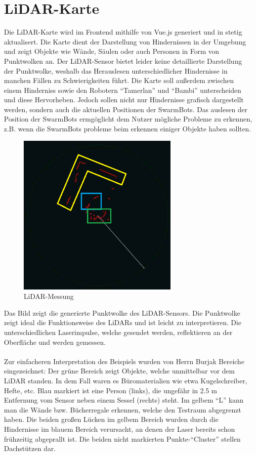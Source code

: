 \section{LiDAR-Karte}
\label{subsec:frontend_lidar_map}
Die LiDAR-Karte wird im Frontend mithilfe von Vue.js generiert und in stetig aktualisert. 
Die Karte dient der Darstellung von Hindernissen in der Umgebung und zeigt Objekte wie Wände, 
Säulen oder auch Personen in Form von Punktwolken an. 
%
Der LiDAR-Sensor bietet leider keine detaillierte Darstellung der Punktwolke, 
weshalb das Herauslesen unterschiedlicher Hindernisse in manchen Fällen zu Schwierigkeiten führt. 
%
Die Karte soll außerdem zwischen einem Hinderniss sowie den Robotern ``Tamerlan'' und ``Bambi'' 
unterscheiden und diese Hervorheben. 
%
Jedoch sollen nicht nur Hindernisse grafisch dargestellt werden, 
sondern auch die aktuellen Positionen der SwarmBots.
%
Das auslesen der Position der SwarmBots ermgöglicht dem Nutzer mögliche Probleme zu erkennen, 
z.B. wenn die SwarmBots probleme beim erkennen einiger Objekte haben sollten.  

\begin{figure}[H]
    \includegraphics[width=0.7\textwidth, center]{img/LiDARMessungZeichnung_alt.png}
    \caption{LiDAR-Messung}
    \label{fig:LiDAR-Messung}
\end{figure}

Das Bild zeigt die generierte Punktwolke des LiDAR-Sensors.
%
Die Punktwolke zeigt ideal die Funktionsweise des LiDARs
und ist leicht zu interpretieren.
%
Die unterschiedlichen Laserimpulse,
welche gesendet werden,
reflektieren an der Oberfläche und werden gemessen.
\\\\
Zur einfacheren Interpretation des Beispiels
wurden von Herrn Burjak Bereiche eingezeichnet:
%
Der grüne Bereich zeigt Objekte,
welche unmittelbar vor dem LiDAR standen.
%
In dem Fall waren es Büromaterialien wie etwa Kugelschreiber, Hefte, etc.
%
Blau markiert ist eine Person (links),
die ungefähr in 2.5 m Entfernung vom Sensor
neben einem Sessel (rechts) steht.
%
Im gelbem ``L'' kann man die Wände bzw. Bücherregale erkennen,
welche den Testraum abgegrenzt haben.
Die beiden großen Lücken im gelbem Bereich wurden
durch die Hindernisse im blauem Bereich verursacht,
an denen der Laser bereits schon frühzeitig abgeprallt ist.
%
Die beiden nicht markierten Punkte-``Cluster'' stellen Dachstützen dar.

